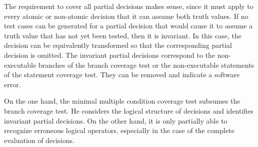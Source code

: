 
	The requirement to cover all partial decisions makes sense, since it must apply to every atomic or non-atomic decision that it can assume both truth values. If no test cases can be generated for a partial decision that would cause it to assume a truth value that has not yet been tested, then it is invariant. In this case, the decision can be equivalently transformed so that the corresponding partial decision is omitted. The invariant partial decisions correspond to the non-executable branches of the branch coverage test or the non-executable statements of the statement coverage test. They can be removed and indicate a software error.

	On the one hand, the minimal multiple condition coverage test subsumes the branch coverage test. He considers the logical structure of decisions and identifies invariant partial decisions. On the other hand, it is only partially able to recognize erroneous logical operators, especially in the case of the complete evaluation of decisions.

